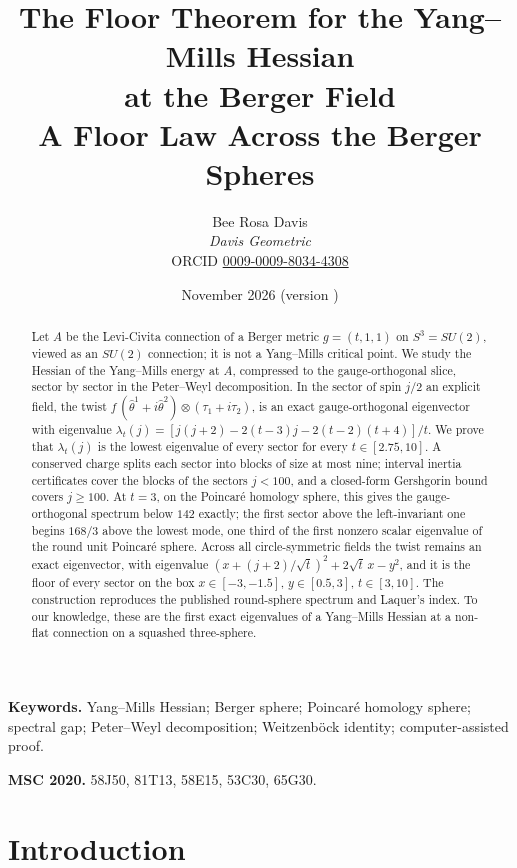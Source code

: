 \documentclass[11pt]{article}
\title{The Floor Theorem for the Yang--Mills Hessian\\ at the Berger Field\\[4pt]
\large A Floor Law Across the Berger Spheres}
\author{Bee Rosa Davis\\[1pt] {\normalsize\upshape\itshape Davis Geometric}\\[1pt]
{\footnotesize\upshape ORCID \href{https://orcid.org/0009-0009-8034-4308}{0009-0009-8034-4308}}}
\date{November 2026 (version \reddel{2}\redins{3.3\ifredline, draft\fi})}
\theoremstyle{definition}
\theoremstyle{remark}
\newif\ifredline
\newcommand{\redins}[1]{\ifredline{\color{blue}#1}\else#1\fi}
\begin{document}
\maketitle

\begin{abstract}
\redins{Let $A$ be the Levi-Civita connection of a Berger metric $g=(t,1,1)$ on $S^3=SU(2)$, viewed as an $SU(2)$
connection; it is not a Yang--Mills critical point. We study the Hessian of the Yang--Mills energy at $A$, compressed
to the gauge-orthogonal slice, sector by sector in the Peter--Weyl decomposition. In the sector of spin $j/2$ an
explicit field, the twist $f\,(\hat\theta^1+i\hat\theta^2)\otimes(\tau_1+i\tau_2)$, is an exact gauge-orthogonal
eigenvector with eigenvalue
$\lambda_t(j)=[j(j+2)-2(t-3)j-2(t-2)(t+4)]/t$. We prove that $\lambda_t(j)$ is the lowest eigenvalue of every sector
for every $t\in[2.75,10]$. A conserved charge splits each sector into blocks of size at most nine; interval inertia
certificates cover the blocks of the sectors $j<100$, and a closed-form Gershgorin bound covers $j\ge100$. At $t=3$, on
the Poincar\'e homology sphere, this gives the gauge-orthogonal spectrum below $142$ exactly; the first sector above
the left-invariant one begins $168/3$ above the lowest mode, one third of the first nonzero scalar eigenvalue of the
round unit Poincar\'e sphere. Across all circle-symmetric fields the twist remains an exact eigenvector, with
eigenvalue $(x+(j+2)/\sqrt t)^2+2\sqrt t\,x-y^2$, and it is the floor of every sector on the box $x\in[-3,-1.5]$,
$y\in[0.5,3]$, $t\in[3,10]$. The construction reproduces the published round-sphere spectrum and Laquer's index. To
our knowledge, these are the first exact eigenvalues of a Yang--Mills Hessian at a non-flat connection on a squashed
three-sphere.}
\end{abstract}

\noindent\textbf{Keywords.} Yang--Mills Hessian; Berger sphere; Poincar\'e homology sphere; spectral
gap; Peter--Weyl decomposition; Weitzenb\"ock identity; computer-assisted proof.

\noindent\textbf{MSC 2020.} 58J50, 81T13, 58E15, 53C30, 65G30.

\section{Introduction}\label{sec:intro}
\end{document}
